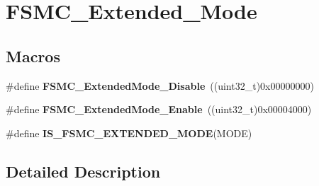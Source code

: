 \hypertarget{group___f_s_m_c___extended___mode}{\section{F\-S\-M\-C\-\_\-\-Extended\-\_\-\-Mode}
\label{group___f_s_m_c___extended___mode}
}
\subsection*{Macros}
\begin{DoxyCompactItemize}
\item 
\hypertarget{group___f_s_m_c___extended___mode_ga5a1f1acdc44328158f59012748980dd3}{\#define {\bfseries F\-S\-M\-C\-\_\-\-Extended\-Mode\-\_\-\-Disable}~((uint32\-\_\-t)0x00000000)}\label{group___f_s_m_c___extended___mode_ga5a1f1acdc44328158f59012748980dd3}

\item 
\hypertarget{group___f_s_m_c___extended___mode_gaef9ff4c81a52fdb0471d2c4422271d2a}{\#define {\bfseries F\-S\-M\-C\-\_\-\-Extended\-Mode\-\_\-\-Enable}~((uint32\-\_\-t)0x00004000)}\label{group___f_s_m_c___extended___mode_gaef9ff4c81a52fdb0471d2c4422271d2a}

\item 
\#define {\bfseries I\-S\-\_\-\-F\-S\-M\-C\-\_\-\-E\-X\-T\-E\-N\-D\-E\-D\-\_\-\-M\-O\-D\-E}(M\-O\-D\-E)
\end{DoxyCompactItemize}


\subsection{Detailed Description}


